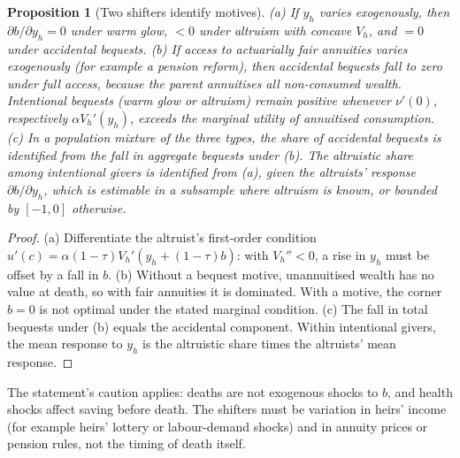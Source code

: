 \documentclass[11pt]{article}
\newtheorem{proposition}[theorem]{Proposition}
\theoremstyle{definition}
\begin{document}
\begin{proposition}[Two shifters identify motives]\label{prop:id}
(a) If $y_h$ varies exogenously, then $\partial b/\partial y_h=0$ under warm glow, $<0$ under altruism with concave $V_h$,
and $=0$ under accidental bequests.
(b) If access to actuarially fair annuities varies exogenously (for example a pension reform), then accidental bequests fall
to zero under full access, because the parent annuitises all non-consumed wealth. Intentional bequests (warm glow or
altruism) remain positive whenever $\nu'(0)$, respectively $\alpha V_h'(y_h)$, exceeds the marginal utility of annuitised
consumption.
(c) In a population mixture of the three types, the share of accidental bequests is identified from the fall in aggregate
bequests under (b). The altruistic share among intentional givers is identified from (a), given the altruists'
response $\partial b/\partial y_h$, which is estimable in a subsample where altruism is known, or bounded by $[-1,0]$
otherwise.
\end{proposition}
\begin{proof}
(a) Differentiate the altruist's first-order condition $u'(c)=\alpha(1-\tau)V_h'(y_h+(1-\tau)b)$: with $V_h''<0$, a rise in
$y_h$ must be offset by a fall in $b$. (b) Without a bequest motive, unannuitised wealth has no value at death, so with
fair annuities it is dominated. With a motive, the corner $b=0$ is not optimal under the stated marginal condition.
(c) The fall in total bequests under (b) equals the accidental component. Within intentional givers, the mean response to
$y_h$ is the altruistic share times the altruists' mean response.
\end{proof}
The statement's caution applies: deaths are not exogenous shocks to $b$, and health shocks affect saving before death. The
shifters must be variation in heirs' income (for example heirs' lottery or labour-demand shocks) and in annuity prices or
pension rules, not the timing of death itself.
\end{document}
